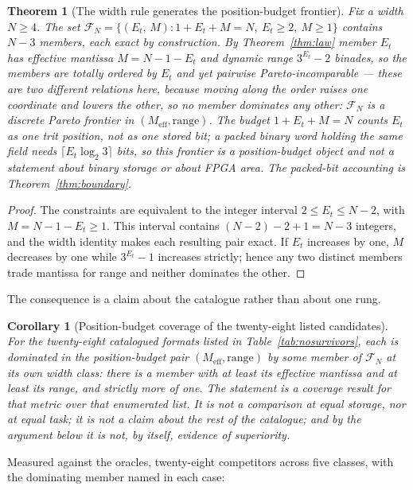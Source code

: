 \documentclass[11pt]{article}
\newtheorem{theorem}{Theorem}
\newtheorem{corollary}{Corollary}
\theoremstyle{definition}
\begin{document}
\begin{theorem}[The width rule generates the position-budget frontier]
\label{thm:family}
Fix a width $N\geq4$. The set
$\mathcal{F}_N = \{(E_t,\, M) : 1 + E_t + M = N,\ E_t \geq 2,\ M \geq 1\}$
contains $N-3$ members, each exact by construction. By
Theorem~\ref{thm:law} member $E_t$ has effective mantissa $M = N-1-E_t$ and
dynamic range $3^{E_t}-2$ binades, so the members are totally ordered by $E_t$ and
yet pairwise Pareto-incomparable --- these are two different relations here, because
moving along the order raises one coordinate and lowers the other, so no member
dominates any other: $\mathcal{F}_N$ is a discrete Pareto frontier in
$(M_{\mathrm{eff}}, \text{range})$. The budget $1+E_t+M=N$ counts $E_t$ as one
\emph{trit position}, not as one stored bit; a packed binary word holding the
same field needs $\lceil E_t\log_2 3\rceil$ bits, so this frontier is a
position-budget object and not a statement about binary storage or about FPGA
area. The packed-bit accounting is Theorem~\ref{thm:boundary}.
\end{theorem}
\begin{proof}
The constraints are equivalent to the integer interval
$2\leq E_t\leq N-2$, with $M=N-1-E_t\geq1$. This interval contains
$(N-2)-2+1=N-3$ integers, and the width identity makes each resulting pair
exact. If $E_t$ increases by one, $M$ decreases by one while
$3^{E_t}-1$ increases strictly; hence any two distinct members trade mantissa
for range and neither dominates the other.
\end{proof}

The consequence is a claim about the catalogue rather than about one rung.

\sloppy
\begin{corollary}[Position-budget coverage of the twenty-eight listed
candidates]
\label{cor:nosurvivors}
For the twenty-eight catalogued formats listed in
Table~\ref{tab:nosurvivors}, each is dominated in the position-budget pair
$(M_{\mathrm{eff}}, \text{range})$ by some member of $\mathcal{F}_N$ at its own
width class: there is a member with at least its effective mantissa and at least
its range, and strictly more of one. The statement is a coverage result for that
metric over that enumerated list. It is not a comparison at equal storage, nor
at equal task; it is not a claim about the rest of the catalogue; and by the
argument below it is not, by itself, evidence of superiority.
\end{corollary}
\fussy

Measured against the oracles, twenty-eight competitors across five classes, with
the dominating member named in each case:
\end{document}
